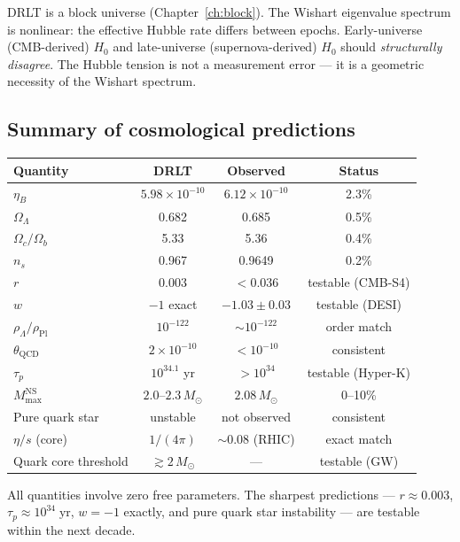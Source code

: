 \documentclass[12pt]{article}
\theoremstyle{remark}
\theoremstyle{definition}
\begin{document}
DRLT is a block universe (Chapter~\ref{ch:block}). The Wishart eigenvalue spectrum is nonlinear: the effective Hubble rate differs between epochs. Early-universe (CMB-derived) $H_0$ and late-universe (supernova-derived) $H_0$ should \emph{structurally disagree}. The Hubble tension is not a measurement error --- it is a geometric necessity of the Wishart spectrum.

\subsection{Summary of cosmological predictions}

\begin{center}
\begin{tabular}{lccc}
\hline
Quantity & DRLT & Observed & Status \\
\hline
$\eta_B$ & $5.98 \times 10^{-10}$ & $6.12 \times 10^{-10}$ & 2.3\% \\
$\Omega_\Lambda$ & 0.682 & 0.685 & 0.5\% \\
$\Omega_c/\Omega_b$ & 5.33 & 5.36 & 0.4\% \\
$n_s$ & 0.967 & 0.9649 & 0.2\% \\
$r$ & 0.003 & $< 0.036$ & testable (CMB-S4) \\
$w$ & $-1$ exact & $-1.03 \pm 0.03$ & testable (DESI) \\
$\rho_\Lambda/\rho_\text{Pl}$ & $10^{-122}$ & $\sim 10^{-122}$ & order match \\
$\theta_\text{QCD}$ & $2 \times 10^{-10}$ & $< 10^{-10}$ & consistent \\
$\tau_p$ & $10^{34.1}$ yr & $> 10^{34}$ & testable (Hyper-K) \\
$M_\text{max}^\text{NS}$ & $2.0$--$2.3\,M_\odot$ & $2.08\,M_\odot$ & 0--10\% \\
Pure quark star & unstable & not observed & consistent \\
$\eta/s$ (core) & $1/(4\pi)$ & $\sim 0.08$ (RHIC) & exact match \\
Quark core threshold & $\gtrsim 2\,M_\odot$ & --- & testable (GW) \\
\hline
\end{tabular}
\end{center}

All quantities involve zero free parameters. The sharpest predictions --- $r \approx 0.003$, $\tau_p \approx 10^{34}\;\text{yr}$, $w = -1$ exactly, and pure quark star instability --- are testable within the next decade.
\end{document}
